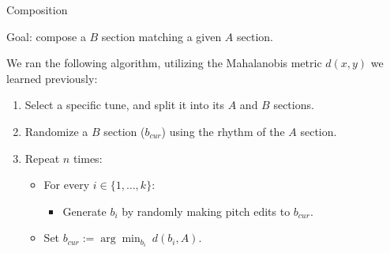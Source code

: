 \documentclass[letterpaper]{amsart}
\begin{document}
\begin{center}
\Huge
Composition
\end{center}
\huge
Goal: compose a $B$ section matching a given $A$ section.

We ran the following algorithm, utilizing the Mahalanobis metric $d(x, y)$ we learned previously:
\begin{enumerate}[label={\arabic*.}]
\item Select a specific tune, and split it into its $A$ and $B$ sections.

\item Randomize a $B$ section ($b_{cur}$) using the rhythm of the $A$ section.

\item Repeat $n$ times:
\begin{itemize}\parskip=0.05in
\item[] For every $i \in \{1, \dots, k\}$:
\begin{itemize}
\item[] Generate $b_i$ by randomly making pitch edits to $b_{cur}$.
\end{itemize}
\item[] Set
$\displaystyle{b_{cur} := \arg \min_{b_i} \  d(b_i, A)}$.
\end{itemize}
\end{enumerate}


\end{document}
